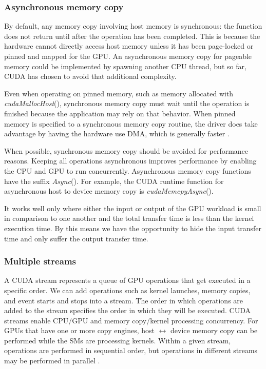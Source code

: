 \subsubsection*{Asynchronous memory copy}
By default, any memory copy involving host memory is synchronous: the function does not return until after the operation has been completed. This is because the hardware cannot directly access host memory unless it has been page-locked or pinned and mapped for the GPU. An asynchronous memory copy for pageable memory could be implemented by spawning another CPU thread, but so far, CUDA has chosen to avoid that additional complexity.

Even when operating on pinned memory, such as memory allocated with \emph{cudaMallocHost}(), synchronous memory copy must wait until the operation is finished because the application may rely on that behavior. When pinned memory is specified to a synchronous memory copy routine, the driver does take advantage by having the hardware use DMA, which is generally faster \citep{CUDAHand}.

When possible, synchronous memory copy should be avoided for performance reasons. Keeping all operations asynchronous improves performance by enabling the CPU and GPU to run concurrently. Asynchronous memory copy functions have the suffix \emph{Async}(). For example, the CUDA runtime function for asynchronous host to device memory copy is \emph{cudaMemcpyAsync}().

It works well only where either the input or output of the GPU workload is small in comparison to one another and the total transfer time is less than the kernel execution time. By this means we have the opportunity to hide the input transfer time and only suffer the output transfer time.

\subsubsection*{Multiple streams}
A CUDA stream represents a queue of GPU operations that get executed in a specific order. We can add operations such as kernel launches, memory copies, and event starts and stops into a stream. The order in which operations are added to the stream specifies the order in which they will be executed. CUDA streams enable CPU/GPU and memory copy/kernel processing concurrency. For GPUs that have one or more copy engines, host $\longleftrightarrow$ device memory copy can be performed while the SMs are processing kernels. Within a given stream, operations are performed in sequential order, but operations in different streams may be performed in parallel \citep{CUDAintro}.

